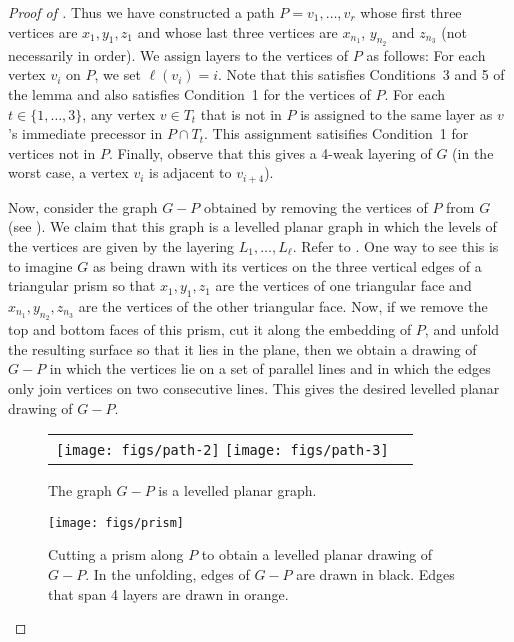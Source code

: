 \documentclass{patmorin}
\begin{document}
\begin{proof}[Proof of ]
  Thus we have constructed a path $P=v_1,\ldots,v_r$ whose first three
  vertices are $x_1,y_1,z_1$ and whose last three vertices are $x_{n_1}$,
  $y_{n_2}$ and $z_{n_3}$ (not necessarily in order).
  We assign layers to the vertices of $P$ as follows: For each
  vertex $v_i$ on $P$, we set $\ell(v_i)=i$.  Note that this satisfies
  Conditions~3 and 5 of the lemma and also satisfies Condition~1 for the
  vertices of $P$.  For each $t\in\{1,\ldots,3\}$, any vertex $v\in T_t$
  that is not in $P$ is assigned to the same layer as $v$'s immediate
  precessor in $P\cap T_t$.  This assignment satisifies Condition~1 for
  vertices not in $P$.  Finally, observe that this gives a 4-weak layering
  of $G$ (in the worst case, a vertex $v_i$ is adjacent to $v_{i+4}$).

  Now, consider the graph $G-P$ obtained by removing the vertices of $P$
  from $G$ (see ).  We claim that this graph is a levelled
  planar graph \cite{bannister.devanny.ea:track} in which the levels of
  the vertices are given by the layering $L_1,\ldots,L_\ell$.  Refer to
  .  One way to see this is to imagine $G$ as being drawn
  with its vertices on the three vertical edges of a triangular prism
  so that $x_1,y_1,z_1$ are the vertices of one triangular face and
  $x_{n_1},y_{n_2},z_{n_3}$ are the vertices of the other triangular
  face.  Now, if we remove the top and bottom faces of this prism,
  cut it along the embedding of $P$, and unfold the resulting surface
  so that it lies in the plane, then we obtain a drawing of $G-P$ in
  which the vertices lie on a set of parallel lines and in which the
  edges only join vertices on two consecutive lines.  This gives the
  desired levelled planar drawing of $G-P$.

  \begin{figure}
  \begin{center}
  \begin{tabular}{cc}
  \texttt{[image: figs/path-2]}
  \texttt{[image: figs/path-3]}
  \end{tabular}
  \end{center}
  \caption{The graph $G-P$ is a levelled planar graph.}
  \end{figure}


  \begin{figure}
     \begin{center}
        \texttt{[image: figs/prism]}
     \end{center}
     \caption{Cutting a prism along $P$ to obtain a levelled planar
      drawing of $G-P$.
      In the unfolding, edges of $G-P$ are drawn in black. Edges that
      span 4 layers are drawn in orange.}
  \end{figure}


\end{proof}
\end{document}
